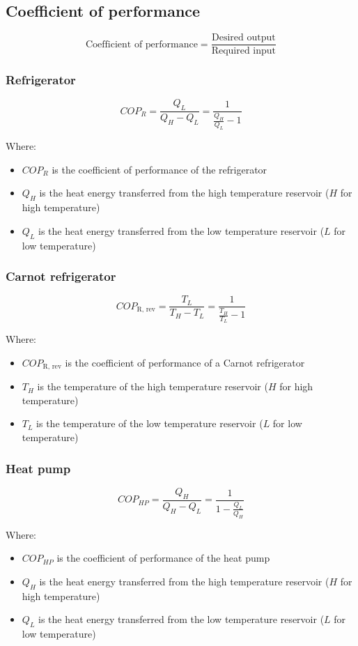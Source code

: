 \documentclass[11pt]{article}
\begin{document}
\subsection{Coefficient of performance}
\label{sec:orgaec6502}
\[\text{Coefficient of performance} = \frac{\text{Desired output}}{\text{Required input}}\]

\subsubsection{Refrigerator}
\label{sec:org2344469}
\[COP_R = \frac{Q_L}{Q_H - Q_L} = \frac{1}{\frac{Q_H}{Q_L} - 1}\]

Where:
\begin{itemize}
\item \(COP_R\) is the coefficient of performance of the refrigerator
\item \(Q_{H}\) is the heat energy transferred from the high temperature reservoir (\(H\) for high temperature)
\item \(Q_{L}\) is the heat energy transferred from the low temperature reservoir (\(L\) for low temperature)
\end{itemize}

\subsubsection{Carnot refrigerator}
\label{sec:org5c6d5ce}
\[COP_{\text{R, rev}} = \frac{T_L}{T_H - T_L} = \frac{1}{\frac{T_H}{T_L} - 1}\]

Where:
\begin{itemize}
\item \(COP_{\text{R, rev}}\) is the coefficient of performance of a Carnot refrigerator
\item \(T_{H}\) is the temperature of the high temperature reservoir (\(H\) for high temperature)
\item \(T_{L}\) is the temperature of the low temperature reservoir (\(L\) for low temperature)
\end{itemize}

\subsubsection{Heat pump}
\label{sec:org614903b}
\[COP_{HP} = \frac{Q_H}{Q_H - Q_L} = \frac{1}{1 - \frac{Q_L}{Q_H}}\]

Where:
\begin{itemize}
\item \(COP_{HP}\) is the coefficient of performance of the heat pump
\item \(Q_{H}\) is the heat energy transferred from the high temperature reservoir (\(H\) for high temperature)
\item \(Q_{L}\) is the heat energy transferred from the low temperature reservoir (\(L\) for low temperature)
\end{itemize}
\end{document}
